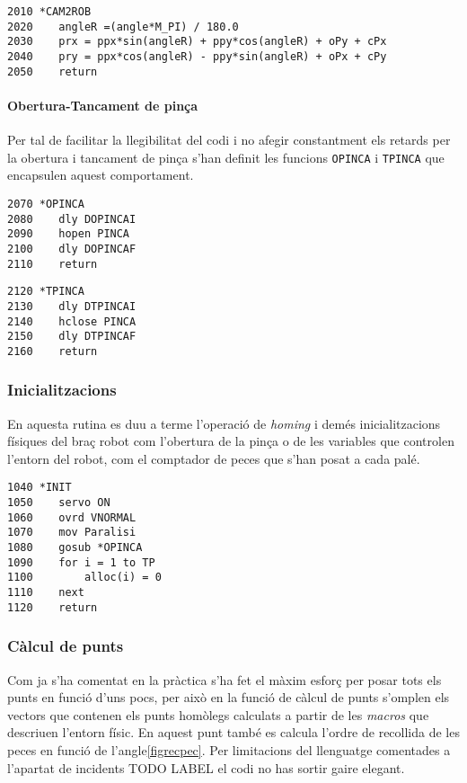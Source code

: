 \begin{verbatim}
2010 *CAM2ROB
2020 	angleR =(angle*M_PI) / 180.0
2030    prx = ppx*sin(angleR) + ppy*cos(angleR) + oPy + cPx
2040    pry = ppx*cos(angleR) - ppy*sin(angleR) + oPx + cPy
2050    return
\end{verbatim}

\paragraph{Obertura-Tancament de pinça}
Per tal de facilitar la llegibilitat del codi i no afegir constantment
els retards per la obertura i tancament de pinça s'han definit les funcions
\texttt{OPINCA} i \texttt{TPINCA} que encapsulen aquest comportament.

\begin{verbatim}
2070 *OPINCA
2080    dly DOPINCAI
2090    hopen PINCA
2100    dly DOPINCAF
2110    return
\end{verbatim}
\begin{verbatim}
2120 *TPINCA
2130    dly DTPINCAI
2140    hclose PINCA
2150    dly DTPINCAF
2160    return
\end{verbatim}

\subsubsection{Inicialitzacions}
En aquesta rutina es duu a terme l'operació de \emph{homing} i demés
inicialitzacions físiques del braç robot com l'obertura de la pinça
o de les variables que controlen l'entorn del robot, com el 
comptador de peces que s'han posat a cada palé.

\begin{verbatim}
1040 *INIT
1050    servo ON
1060    ovrd VNORMAL
1070    mov Paralisi
1080    gosub *OPINCA
1090    for i = 1 to TP
1100        alloc(i) = 0
1110    next
1120    return
\end{verbatim}

\subsubsection{Càlcul de punts}\label{codcalcpts}
Com ja s'ha comentat en la pràctica s'ha fet el màxim esforç per posar tots els
punts en funció d'uns pocs, per això en la funció de càlcul de punts s'omplen
els vectors que contenen els punts homòlegs calculats a partir de les
\emph{macros} que descriuen l'entorn físic. En aquest punt també es calcula
l'ordre de recollida de les peces en funció de l'angle\ref{figrecpec}. Per limitacions del
llenguatge comentades a l'apartat de incidents TODO LABEL el codi no has
sortir gaire elegant.

